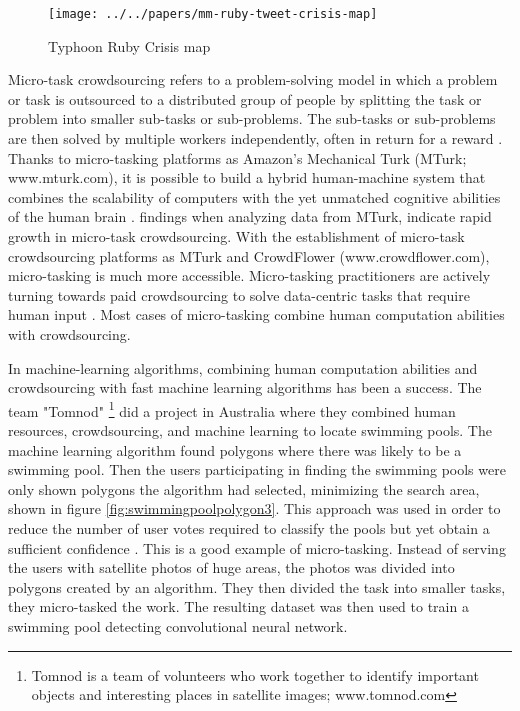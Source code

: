\begin{figure}[H]
	\centering
	\texttt{[image: ../../papers/mm-ruby-tweet-crisis-map]}
	\caption[Crisis map \citep{Meier2014}]{Typhoon Ruby Crisis map \citep{Meier2014}}
	\label{fig:mm-ruby-tweet-crisis-map}
\end{figure}

Micro-task crowdsourcing refers to a problem-solving model in which a problem or task is outsourced to a distributed group of people by splitting the task or problem into smaller sub-tasks or sub-problems. The sub-tasks or sub-problems are then solved by multiple workers independently, often in return for a reward \citep{Sarasua2012}. Thanks to micro-tasking platforms as Amazon's Mechanical Turk (MTurk; www.mturk.com), it is possible to build a hybrid human-machine system that combines the scalability of computers with the yet unmatched cognitive abilities of the human brain \citep{Difallah2016}. \cite{Gadiraju2015} findings when analyzing data from MTurk, indicate rapid growth in micro-task crowdsourcing. With the establishment of micro-task crowdsourcing platforms as MTurk and CrowdFlower (www.crowdflower.com), micro-tasking is much more accessible. Micro-tasking practitioners are actively turning towards paid crowdsourcing to solve data-centric tasks that require human input \citep{Gadiraju2015}. Most cases of micro-tasking combine human computation abilities with crowdsourcing.

In machine-learning algorithms, combining human computation abilities and crowdsourcing with fast machine learning algorithms has been a success. The team "Tomnod" \footnote{Tomnod is a team of volunteers who work together to identify important objects and interesting places in satellite images; www.tomnod.com} did a project in Australia where they combined human resources, crowdsourcing, and machine learning to locate swimming pools. The machine learning algorithm found polygons where there was likely to be a swimming pool. Then the users participating in finding the swimming pools were only shown polygons the algorithm had selected, minimizing the search area, shown in figure \ref{fig:swimmingpoolpolygon3}. This approach was used in order to reduce the number of user votes required to classify the pools but yet obtain a sufficient confidence \citep{Kostas2016}. This is a good example of micro-tasking. Instead of serving the users with satellite photos of huge areas, the photos was divided into polygons created by an algorithm. They then divided the task into smaller tasks, they micro-tasked the work. The resulting dataset was then used to train a swimming pool detecting convolutional neural network.


